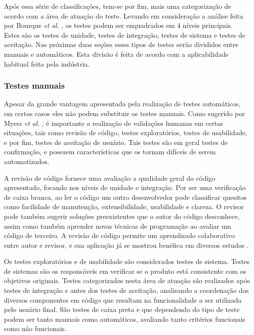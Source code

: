 Após essa série de classificações, tem-se por fim, mais uma categorização de acordo com a área de atuação do teste. Levando em consideração a análise feita por Bourque \emph{et al.} \cite{bourque}, os testes podem ser enquadrados em 4 níveis principais. Estes são os testes de unidade, testes de integração, testes de sistema e testes de aceitação. Nas próximas duas seções esses tipos de testes serão divididos entre manuais e automáticos. Esta divisão é feita de acordo com a aplicabilidade habitual feita pela indústria.

\hypertarget{testes-manuais}{%
\subsubsection{Testes manuais}\label{testes-manuais}}

Apesar da grande vantagem apresentada pela realização de testes automáticos, em certos casos eles não podem substituir os testes manuais. Como sugerido por Myers \emph{et al.} \cite{myers}, é importante a realização de validações humanas em certas situações, tais como revisão de código, testes exploratórios, testes de usabilidade, e por fim, testes de aceitação de usuário. Tais testes são em geral testes de confirmação, e possuem características que os tornam difíceis de serem automatizados.

A revisão de código fornece uma avaliação a qualidade geral do código apresentado, focando nos níveis de unidade e integração. Por ser uma verificação de caixa branca, ao ler o código um outro desenvolvedor pode classificar quesitos como facilidade de manutenção, extensibilidade, usabilidade e clareza. O revisor pode também sugerir soluções preexistentes que o autor do código desconhece, assim como também aprender novas técnicas de programação ao avaliar um código de terceiro. A revisão de código permite um aprendizado colaborativo entre autor e revisor, e sua aplicação já se mostrou benéfica em diversos estudos \cite{bacchelli}.

Os testes exploratórios e de usabilidade são considerados testes de sistema. Testes de sistemas são os responsáveis em verificar se o produto está consistente com os objetivos originais. Testes categorizados nesta área de atuação são realizados após testes de integração e antes dos testes de aceitação, analisando a coordenação dos diversos componentes em código que resultam na funcionalidade a ser utilizada pelo usuário final. São testes de caixa preta e que dependendo do tipo de teste podem ser tanto manuais como automáticos, avaliando tanto critérios funcionais como não funcionais.

